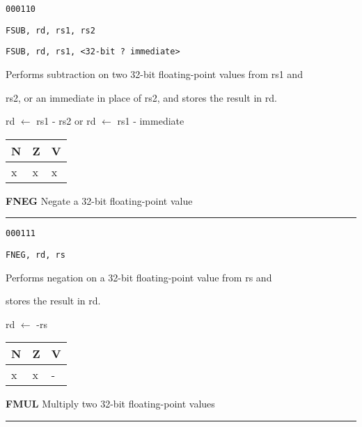 \documentclass{article}
\begin{document}
{\large
	 \texttt{000110} \par
	\smallbreak
	 \texttt{FSUB, rd, rs1, rs2} \par
	\smallbreak
	 \texttt{FSUB, rd, rs1, <32-bit ? immediate>} \par
	\smallbreak
	 Performs subtraction on two 32-bit floating-point values from rs1 and \par
	\makebox[3.5cm][l]{  } rs2, or an immediate in place of rs2, and stores the result in rd. \par
	\smallbreak
	 rd $\leftarrow$ rs1 - rs2 \quad or \quad rd $\leftarrow$ rs1 - immediate\par
	\smallbreak
	 \begin{tabular}{lll} N \quad & Z \quad & V \\ \hline x & x & x \\ \end{tabular}
}

\bigskip\bigskip

\flushleft
\LARGE\textbf{FNEG} \large \hfill Negate a 32-bit floating-point value

\kern-3pt
\noindent\rule{16.5cm}{0.4pt}
\normalsize

{\large
	 \texttt{000111} \par
	\smallbreak
	 \texttt{FNEG, rd, rs} \par
	\smallbreak
	 Performs negation on a 32-bit floating-point value from rs and \par
	\makebox[3.5cm][l]{  } stores the result in rd. \par
	\smallbreak
	 rd $\leftarrow$ -rs \par 
	\smallbreak
	 \begin{tabular}{lll} N \quad & Z \quad & V \\ \hline x & x & - \\ \end{tabular}
}

\pagebreak

\flushleft
\LARGE\textbf{FMUL} \large \hfill Multiply two 32-bit floating-point values

\kern-3pt
\noindent\rule{16.5cm}{0.4pt}
\normalsize
\end{document}
